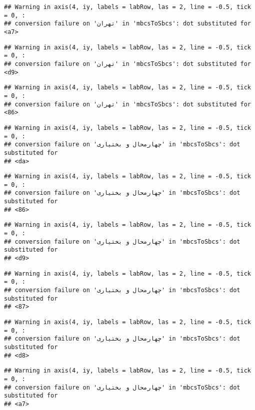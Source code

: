 \documentclass[
]{article}
\begin{document}
\begin{verbatim}
## Warning in axis(4, iy, labels = labRow, las = 2, line = -0.5, tick = 0, :
## conversion failure on 'تهران' in 'mbcsToSbcs': dot substituted for <a7>
\end{verbatim}

\begin{verbatim}
## Warning in axis(4, iy, labels = labRow, las = 2, line = -0.5, tick = 0, :
## conversion failure on 'تهران' in 'mbcsToSbcs': dot substituted for <d9>
\end{verbatim}

\begin{verbatim}
## Warning in axis(4, iy, labels = labRow, las = 2, line = -0.5, tick = 0, :
## conversion failure on 'تهران' in 'mbcsToSbcs': dot substituted for <86>
\end{verbatim}

\begin{verbatim}
## Warning in axis(4, iy, labels = labRow, las = 2, line = -0.5, tick = 0, :
## conversion failure on 'چهارمحال و بختیاری' in 'mbcsToSbcs': dot substituted for
## <da>
\end{verbatim}

\begin{verbatim}
## Warning in axis(4, iy, labels = labRow, las = 2, line = -0.5, tick = 0, :
## conversion failure on 'چهارمحال و بختیاری' in 'mbcsToSbcs': dot substituted for
## <86>
\end{verbatim}

\begin{verbatim}
## Warning in axis(4, iy, labels = labRow, las = 2, line = -0.5, tick = 0, :
## conversion failure on 'چهارمحال و بختیاری' in 'mbcsToSbcs': dot substituted for
## <d9>
\end{verbatim}

\begin{verbatim}
## Warning in axis(4, iy, labels = labRow, las = 2, line = -0.5, tick = 0, :
## conversion failure on 'چهارمحال و بختیاری' in 'mbcsToSbcs': dot substituted for
## <87>
\end{verbatim}

\begin{verbatim}
## Warning in axis(4, iy, labels = labRow, las = 2, line = -0.5, tick = 0, :
## conversion failure on 'چهارمحال و بختیاری' in 'mbcsToSbcs': dot substituted for
## <d8>
\end{verbatim}

\begin{verbatim}
## Warning in axis(4, iy, labels = labRow, las = 2, line = -0.5, tick = 0, :
## conversion failure on 'چهارمحال و بختیاری' in 'mbcsToSbcs': dot substituted for
## <a7>
\end{verbatim}
\end{document}
